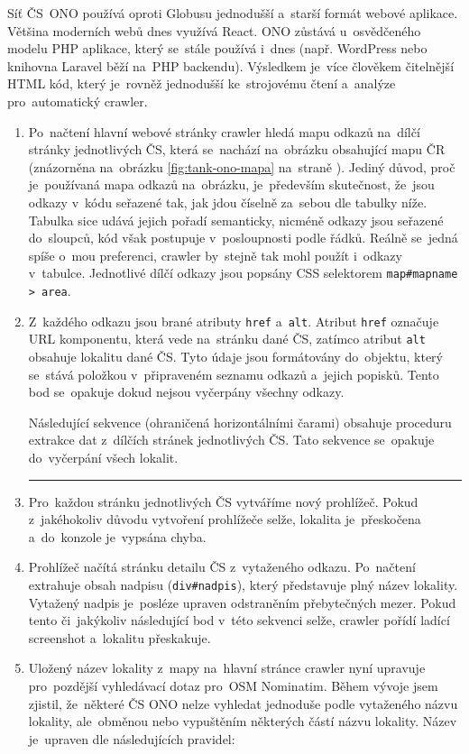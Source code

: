 Síť ČS~ONO používá oproti Globusu jednodušší a~starší formát webové aplikace.
Většina moderních webů dnes využívá React. ONO zůstává u~osvědčeného modelu
PHP aplikace, který se~stále používá i~dnes (např. WordPress nebo knihovna
Laravel běží na~PHP backendu). Výsledkem je~více člověkem čitelnější HTML
kód, který je~rovněž jednodušší ke~strojovému čtení a~analýze pro~automatický
crawler.

\begin{enumerate}
    \item Po~načtení hlavní webové stránky crawler hledá mapu odkazů
        na~dílčí stránky jednotlivých ČS, která se~nachází na~obrázku
        obsahující mapu ČR (znázorněna na~obrázku \ref{fig:tank-ono-mapa}
        na~straně \pageref{fig:tank-ono-mapa}). Jediný důvod, proč
        je~používaná mapa odkazů na~obrázku, je~především skutečnost,
        že~jsou odkazy v~kódu seřazené tak, jak jdou číselně za~sebou
        dle tabulky níže. Tabulka sice udává jejich pořadí semanticky,
        nicméně odkazy jsou seřazené do~sloupců, kód však postupuje
        v~posloupnosti podle řádků. Reálně se~jedná spíše o~mou preferenci,
        crawler by~stejně tak mohl použít i~odkazy v~tabulce. Jednotlivé
        dílčí odkazy jsou popsány CSS selektorem
        \texttt{map\#mapname > area}.
    \item Z~každého odkazu jsou brané atributy \texttt{href} a~\texttt{alt}.
        Atribut \texttt{href} označuje URL komponentu, která vede na~stránku
        dané ČS, zatímco atribut \texttt{alt} obsahuje lokalitu dané ČS.
        Tyto údaje jsou formátovány do~objektu, který se~stává položkou
        v~připraveném seznamu odkazů a~jejich popisků. Tento bod se~opakuje
        dokud nejsou vyčerpány všechny odkazy.

        Následující sekvence (ohraničená horizontálními čarami) obsahuje
        proceduru extrakce dat z~dílčích stránek jednotlivých ČS. Tato
        sekvence se~opakuje do~vyčerpání všech lokalit.
        \medskip    \hrule
    \item Pro~každou stránku jednotlivých ČS vytváříme nový prohlížeč.
        Pokud z~jakéhokoliv důvodu vytvoření prohlížeče selže, lokalita
        je~přeskočena a~do~konzole je~vypsána chyba.
    \item Prohlížeč načítá stránku detailu ČS z~vytaženého odkazu.
        Po~načtení extrahuje obsah nadpisu (\texttt{div\#nadpis}), který
        představuje plný název lokality. Vytažený nadpis je~posléze upraven
        odstraněním přebytečných mezer. Pokud tento či~jakýkoliv následující
        bod v~této sekvenci selže, crawler pořídí ladící screenshot
        a~lokalitu přeskakuje.
    \item Uložený název lokality z~mapy na~hlavní stránce crawler
        nyní upravuje pro~pozdější vyhledávací dotaz pro~OSM Nominatim.
        Během vývoje jsem zjistil, že~některé ČS ONO nelze vyhledat jednoduše
        podle vytaženého názvu lokality, ale~obměnou nebo vypuštěním některých
        částí názvu lokality. Název je~upraven dle následujících pravidel:


\end{enumerate}
